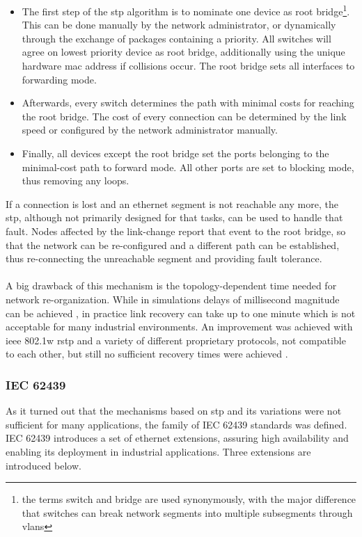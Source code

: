 \begin{itemize}
 \item The first step of the \gls{stp} algorithm is to nominate one device as root bridge\footnote{the terms switch and bridge are used synonymously,
with the major difference that switches can break network segments into multiple subsegments through \glspl{vlan}}. This can be done manually by the network administrator,
or dynamically through the exchange of packages containing a priority. All switches will agree on lowest priority device as root bridge, additionally using the unique
hardware \gls{mac} address if collisions occur. The root bridge sets all interfaces to forwarding mode. 
 \item Afterwards, every switch determines the path with minimal costs for reaching the root bridge. The cost of every connection can be determined by the link
 speed or configured by the network administrator manually.
 \item Finally, all devices except the root bridge set the ports belonging to the minimal-cost path to forward mode. All other ports are set to blocking mode, thus removing
 any loops.
\end{itemize}
If a connection is lost and an ethernet segment is not 
reachable any more, the \gls{stp}, although not primarily designed for that tasks, can be used to handle that fault. Nodes affected by the link-change report
that event to the root bridge, so that the network can be re-configured and a different path can be established, thus re-connecting the unreachable segment
and providing fault tolerance. 
\\
\\
A big drawback of this mechanism is the topology-dependent
time needed for network re-organization. While in simulations delays of millisecond magnitude can be achieved \cite{4447112}, in practice link recovery
can take up to one minute which is not acceptable for many industrial environments. An improvement was achieved with \gls{ieee} 802.1w \gls{rstp} and
a variety of different proprietary protocols, not compatible to each other, but still no sufficient recovery times were achieved \cite{1704183}.

\subsubsection{IEC 62439}

As it turned out that the mechanisms based on \gls{stp} and its variations were not 
sufficient for many applications, the family of IEC 62439 standards was defined. IEC 62439 introduces a set of ethernet extensions, assuring high availability
and enabling its deployment in industrial applications. Three extensions are introduced below.

